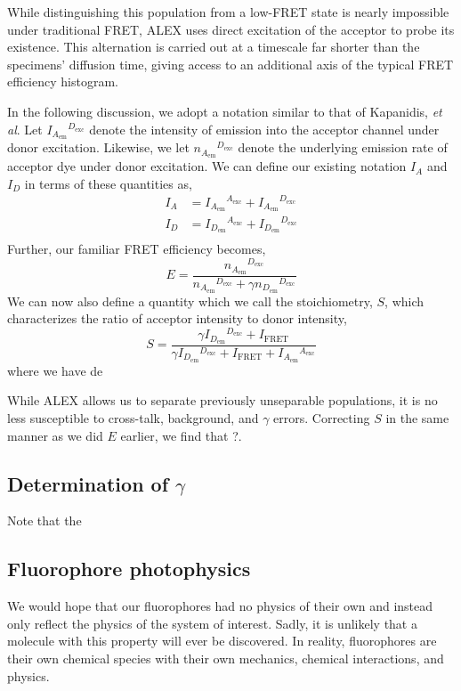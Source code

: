 \documentclass{article}
\newcommand{\emm}[1]{\ensuremath{_{#1_\mathrm{em}}}}   %
\newcommand{\exc}[1]{\ensuremath{^{#1_\mathrm{exc}}}}  %
\begin{document}
While distinguishing this population from a low-FRET state is nearly
impossible under traditional FRET, ALEX uses direct excitation of the
acceptor to probe its existence. This alternation is carried out at a
timescale far shorter than the specimens' diffusion time, giving
access to an additional axis of the typical FRET efficiency histogram.

In the following discussion, we adopt a notation similar to that of
Kapanidis, {\it et al}. Let $I\emm{A}\exc{D}$ denote the intensity of
emission into the acceptor channel under donor excitation. Likewise,
we let $n\emm{A}\exc{D}$ denote the underlying emission rate of
acceptor dye under donor excitation.  We can define our existing
notation $I_A$ and $I_D$ in terms of these quantities as,
\begin{align*}
  I_A & = I\emm{A}\exc{A} + I\emm{A}\exc{D} \\
  I_D & = I\emm{D}\exc{A} + I\emm{D}\exc{D} \\
\end{align*}
Further, our familiar FRET efficiency becomes,
\[ E = \frac{ n\emm{A}\exc{D} }{ n\emm{A}\exc{D} + \gamma n\emm{D}\exc{D} } \]
We can now also define a quantity which we call the
stoichiometry, $S$, which characterizes the ratio of acceptor
intensity to donor intensity,
\newcommand{\Ifret}{\ensuremath{I_\mathrm{FRET}}}
\[ S = \frac{\gamma I\emm{D}\exc{D} + \Ifret}{\gamma I\emm{D}\exc{D} + \Ifret + I\emm{A}\exc{A}} \]
where we have de

While ALEX allows us to separate previously unseparable populations,
it is no less susceptible to cross-talk, background, and $\gamma$
errors. Correcting $S$ in the same manner as we did $E$ earlier, we
find that ?.


\subsection{Determination of $\gamma$}

Note that the

\subsection{Fluorophore photophysics}
We would hope that our fluorophores had no physics of their own and
instead only reflect the physics of the system of interest. Sadly,
it is unlikely that a molecule with this property will ever be
discovered. In reality, fluorophores are their own chemical species
with their own mechanics, chemical interactions, and physics. 
\end{document}
